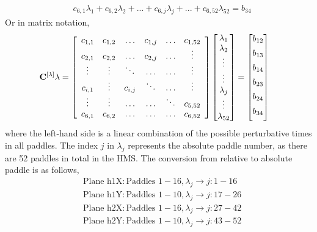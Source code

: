 \documentclass[14pt]{article}
\begin{document}
\begin{itemize}
\begin{equation}
\begin{split}
  &c_{6,1}\lambda_{1} +  c_{6,2}\lambda_{2} + . . . + c_{6,j}\lambda_{j} + . . . + c_{6,52}\lambda_{52} =  b_{34}
\end{split}
\end{equation}
Or in matrix notation,
\begin{align}
\bf{C^{[\lambda]}}\lambda &= \left[\begin{array}{cccccc}
  c_{1,1} & c_{1,2} & \hdots & c_{1,j} & \hdots & c_{1,52} \\
  c_{2,1} & c_{2,2} & \hdots & c_{2,j} & \hdots & \vdots \\
    \vdots & \vdots & \ddots & \hdots & \hdots & \vdots \\
  c_{i,1} & \vdots & c_{i,j} & \ddots & \hdots & \vdots \\
    \vdots & \vdots & \hdots & \hdots & \ddots & c_{5,52} \\
    c_{6,1} & c_{6,2} & \hdots & \hdots & \hdots & c_{6,52} \\
  \end{array}\right]
\begin{bmatrix}
  \lambda_{1}  \\
  \lambda_{2}  \\
  \vdots \\
  \vdots \\
  \lambda_{j} \\
  \vdots \\
  \lambda_{52}
\end{bmatrix} 
= \begin{bmatrix}
  \vspace{5px}
  b_{12}  \\
  \vspace{5px}
  b_{13}  \\
  \vspace{5px}
  b_{14}  \\
  \vspace{5px}
  b_{23}  \\
  \vspace{5px}
  b_{24}  \\
  \vspace{5px}
  b_{34}  \\
\end{bmatrix}
\end{align}
where the left-hand side is a linear combination of the possible perturbative times in all paddles. The index $j$ in $\lambda_{j}$
represents the absolute paddle number, as there are 52 paddles in total in the HMS. The conversion from relative to absolute paddle is as
follows,
\begin{align*}
  &\text{Plane h1X}: \text{Paddles } 1-16,  \lambda_{j}\rightarrow j:1-16 \\
  &\text{Plane h1Y}: \text{Paddles } 1-10,  \lambda_{j}\rightarrow j:17-26 \\
  &\text{Plane h2X}: \text{Paddles } 1-16,  \lambda_{j}\rightarrow j:27-42 \\
  &\text{Plane h2Y}: \text{Paddles } 1-10,  \lambda_{j}\rightarrow j:43-52 
\end{align*}


\end{itemize}
\end{document}
